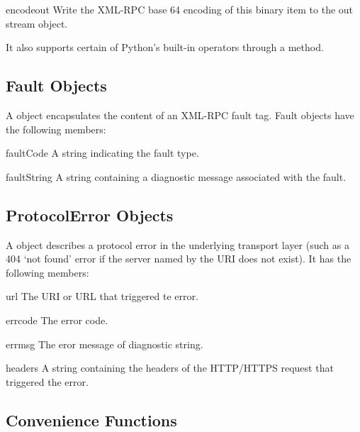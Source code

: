 \begin{methoddesc}{encode}{out}
Write the XML-RPC base 64 encoding of this binary item to the out stream object.
\end{methoddesc}

It also supports certain of Python's built-in operators through a
 method.

\subsection{Fault Objects \label{fault-objects}}

A  object encapsulates the content of an XML-RPC fault tag.
Fault objects have the following members:

\begin{memberdesc}{faultCode}
A string indicating the fault type.
\end{memberdesc}

\begin{memberdesc}{faultString}
A string containing a diagnostic message associated with the fault.
\end{memberdesc}

\subsection{ProtocolError Objects \label{protocol-error-objects}}

A  object describes a protocol error in the
underlying transport layer (such as a 404 `not found' error if the
server named by the URI does not exist).  It has the following
members:

\begin{memberdesc}{url}
The URI or URL that triggered te error.
\end{memberdesc}

\begin{memberdesc}{errcode}
The error code.
\end{memberdesc}

\begin{memberdesc}{errmsg}
The eror message of diagnostic string.
\end{memberdesc}

\begin{memberdesc}{headers}
A string containing the headers of the HTTP/HTTPS request that
triggered the error.
\end{memberdesc}

\subsection{Convenience Functions}

